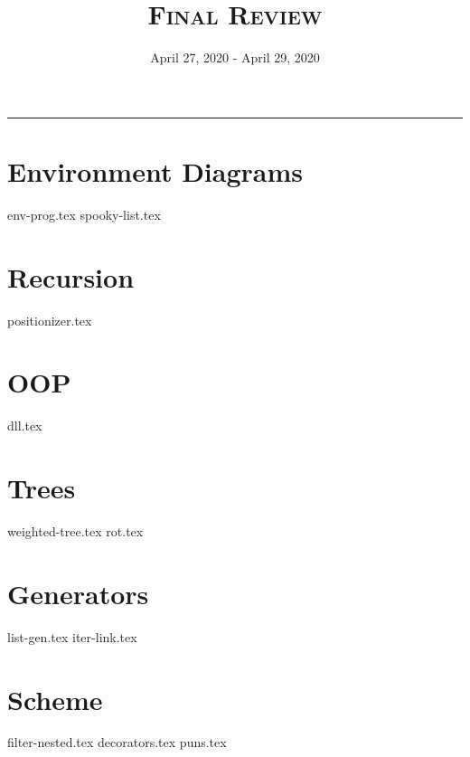 \documentclass{exam}
\title{\textsc{Final Review}}
\date{April 27, 2020 - April 29, 2020}
\begin{document}
\maketitle\rule{\textwidth}{0.15em}
\fontsize{12}{15}\selectfont

\section{Environment Diagrams}
\begin{questions}
{env-prog.tex}
{spooky-list.tex}
\end{questions}
\newpage

\section{Recursion}
\begin{questions}
{positionizer.tex}
\end{questions}
\newpage

\section{OOP}
\begin{questions}
{dll.tex}
\end{questions}
\newpage

\section{Trees}
\begin{questions}
{weighted-tree.tex}
{rot.tex}
\end{questions}

\section{Generators}
\begin{questions}
{list-gen.tex}
{iter-link.tex}
\end{questions}

\section{Scheme}
\begin{questions}
{filter-nested.tex}
\newpage
{decorators.tex}
{puns.tex}
\end{questions}
\end{document}
